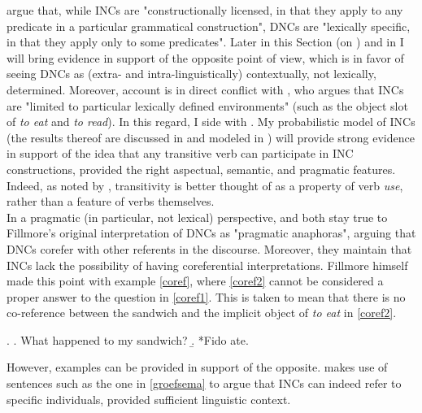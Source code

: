 \textcite[55]{TonelliDelmonte2011} argue that, while INCs are "constructionally licensed, in that they apply to any predicate in a particular grammatical construction", DNCs are "lexically specific, in that they apply only to some predicates". Later in this Section (on ) and in  I will bring evidence in support of the opposite point of view, which is in favor of seeing DNCs as (extra- and intra-linguistically) contextually, not lexically, determined. Moreover,  account is in direct conflict with \textcite[95]{Fillmore1986}, who argues that INCs are "limited to particular lexically defined environments" (such as the object slot of \textit{to eat} and \textit{to read}). In this regard, I side with \textcite{TonelliDelmonte2011}. My probabilistic model of INCs (the results thereof are discussed in  and modeled in ) will provide strong evidence in support of the idea that any transitive verb can participate in INC constructions, provided the right aspectual, semantic, and pragmatic features. Indeed, as noted by \textcite[216]{HuddlestonEtAl2002}, transitivity is better thought of as a property of verb \textit{use}, rather than a feature of verbs themselves.\\
In a pragmatic (in particular, not lexical) perspective, \textcite[44]{AnderBois} and \textcite[53-54]{Melchin2019} both stay true to Fillmore's original interpretation of DNCs as "pragmatic anaphoras", arguing that DNCs corefer with other referents in the discourse. Moreover, they maintain that INCs lack the possibility of having coreferential interpretations. Fillmore himself \parencite[97]{Fillmore1986} made this point with example \ref{coref}, where \ref{coref2} cannot be considered a proper answer to the question in \ref{coref1}. This is taken to mean that there is no co-reference between the sandwich and the implicit object of \textit{to eat} in \ref{coref2}.

\ex. \label{coref} \a. \label{coref1} What happened to my sandwich?
\b. \label{coref2} *Fido ate.

However, examples can be provided in support of the opposite. \textcite[142-144]{groefsema1995understood} makes use of sentences such as the one in \ref{groefsema} to argue that INCs can indeed refer to specific individuals, provided sufficient linguistic context.



